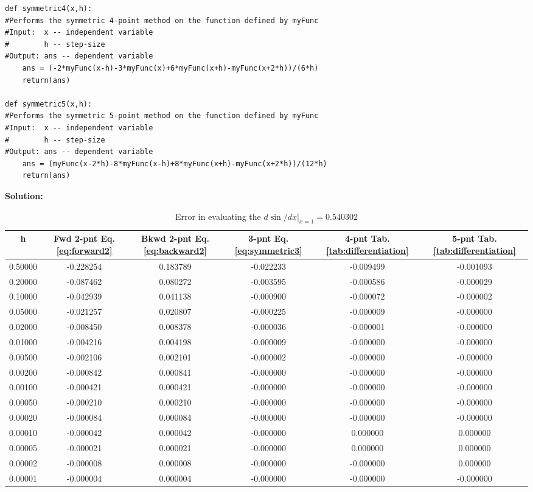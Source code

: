 \documentclass[10pt]{article}
\begin{document}
\begin{lstlisting}
def symmetric4(x,h):
#Performs the symmetric 4-point method on the function defined by myFunc
#Input:  x -- independent variable
#        h -- step-size
#Output: ans -- dependent variable
    ans = (-2*myFunc(x-h)-3*myFunc(x)+6*myFunc(x+h)-myFunc(x+2*h))/(6*h)
    return(ans)

def symmetric5(x,h):
#Performs the symmetric 5-point method on the function defined by myFunc
#Input:  x -- independent variable
#        h -- step-size
#Output: ans -- dependent variable
    ans = (myFunc(x-2*h)-8*myFunc(x-h)+8*myFunc(x+h)-myFunc(x+2*h))/(12*h)
    return(ans)
\end{lstlisting}
\textbf{Solution:}
\begin{table}[!ht]
	\begin{center}
	\caption{Error in evaluating the $d \sin /dx|_{x=1}=0.540302$}
		\label{tab:diff_errors}
		\begin{tabular}{|cccccc|}
		\hline
		h & Fwd 2-pnt Eq. \ref{eq:forward2} & Bkwd 2-pnt Eq. \ref{eq:backward2} & 3-pnt Eq. \ref{eq:symmetric3} & 4-pnt Tab. \ref{tab:differentiation} & 5-pnt Tab. \ref{tab:differentiation} \\
		\hline
		0.50000&-0.228254&0.183789&-0.022233&-0.009499&-0.001093\\ 
		0.20000&-0.087462&0.080272&-0.003595&-0.000586&-0.000029\\ 
		0.10000&-0.042939&0.041138&-0.000900&-0.000072&-0.000002\\ 
		0.05000&-0.021257&0.020807&-0.000225&-0.000009&-0.000000\\ 
		0.02000&-0.008450&0.008378&-0.000036&-0.000001&-0.000000\\ 
		0.01000&-0.004216&0.004198&-0.000009&-0.000000&-0.000000\\ 
		0.00500&-0.002106&0.002101&-0.000002&-0.000000&-0.000000\\ 
		0.00200&-0.000842&0.000841&-0.000000&-0.000000&-0.000000\\ 
		0.00100&-0.000421&0.000421&-0.000000&-0.000000&-0.000000\\ 
		0.00050&-0.000210&0.000210&-0.000000&-0.000000&-0.000000\\ 
		0.00020&-0.000084&0.000084&-0.000000&-0.000000&-0.000000\\ 
		0.00010&-0.000042&0.000042&-0.000000&0.000000&0.000000\\ 
		0.00005&-0.000021&0.000021&-0.000000&0.000000&0.000000\\ 
		0.00002&-0.000008&0.000008&-0.000000&-0.000000&0.000000\\ 
		0.00001&-0.000004&0.000004&-0.000000&-0.000000&-0.000000\\ 
		\hline
		\end{tabular}
	\end{center}
\end{table}
\end{document}
